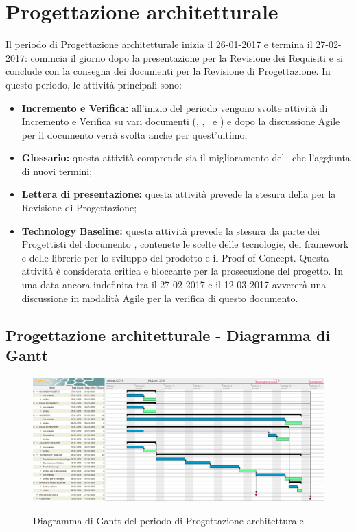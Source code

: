 \documentclass[PianoDiProgetto.tex]{subfiles}
\begin{document}
\section{Progettazione architetturale}
Il periodo di Progettazione architetturale inizia il 26-01-2017 e termina il 27-02-2017: comincia il giorno dopo la presentazione per la Revisione dei Requisiti e si conclude con la consegna dei documenti per la Revisione di Progettazione. In questo periodo, le attività principali sono:
\begin{itemize}
	\item \textbf{Incremento e Verifica:} all'inizio del periodo vengono svolte attività di Incremento e Verifica su vari documenti (\normediprogetto, \pianodiprogetto, \pianodiqualifica\ e \analisideirequisiti) e dopo la discussione Agile per il documento \technology verrà svolta anche per quest'ultimo;
	\item \textbf{Glossario:} questa attività comprende sia il miglioramento del \glossario\ che l'aggiunta di nuovi termini;
	\item \textbf{Lettera di presentazione:} questa attività prevede la stesura della  per la Revisione di Progettazione;
	\item \textbf{Technology Baseline:} questa attività prevede la stesura da parte dei Progettisti del documento \technology, contenete le scelte delle tecnologie, dei framework e delle librerie per lo sviluppo del prodotto e il Proof of Concept. Questa attività è considerata critica e bloccante per la prosecuzione del progetto. In una data ancora indefinita tra il 27-02-2017 e il 12-03-2017 avvererà una discussione in modalità Agile per la verifica di questo documento.
\end{itemize}

\begin{landscape}
	\subsection{Progettazione architetturale - Diagramma di Gantt}
	\begin{figure}[ht]
		\includegraphics[width=19cm]{images/gantt/progArch.png}
		\label{fig:foo}
		\caption{Diagramma di Gantt del periodo di Progettazione architetturale}
	\end{figure}	
\end{landscape}
\end{document}
